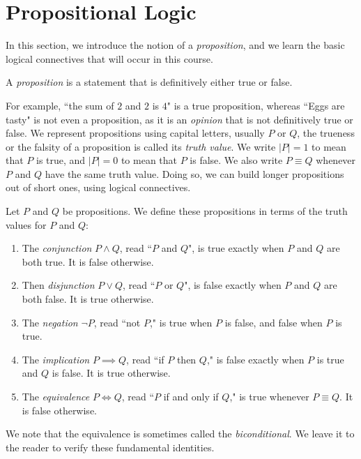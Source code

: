 \documentclass{article}
\begin{document}
\section{Propositional Logic}
In this section, we introduce the notion of a \textit{proposition}, and we learn the basic logical connectives that will occur in this course.
\begin{definition}
A \textit{proposition} is a statement that is definitively either true or false.
\end{definition}
For example, ``the sum of $2$ and $2$ is $4$" is a true proposition, whereas ``Eggs are tasty" is not even a proposition, as it is an \textit{opinion} that is not definitively true or false. We represent propositions using capital letters, usually $P$ or $Q$, the trueness or the falsity of a proposition is called its \textit{truth value}. We write $|P| = 1$ to mean that $P$ is true, and $|P| = 0$ to mean that $P$ is false. We also write $P\equiv Q$ whenever $P$ and $Q$ have the same truth value. Doing so, we can build longer propositions out of short ones, using logical connectives.
\begin{definition}
Let $P$ and $Q$ be propositions. We define these propositions in terms of the truth values for $P$ and $Q$:
\begin{enumerate}
    \item The \textit{conjunction} $P\land Q$, read ``$P$ and $Q$", is true exactly when $P$ and $Q$ are both true. It is false otherwise.
    \item Then \textit{disjunction} $P\lor Q$, read ``$P$ or $Q$", is false exactly when $P$ and $Q$ are both false. It is true otherwise.
    \item The \textit{negation} $\lnot P$, read ``not $P$," is true when $P$ is false, and false when $P$ is true.
    \item The \textit{implication} $P\implies Q$, read ``if $P$ then $Q$," is false exactly when $P$ is true and $Q$ is false. It is true otherwise.
    \item The \textit{equivalence} $P\iff Q$, read ``$P$ if and only if $Q$," is true whenever $P\equiv Q$. It is false otherwise.
\end{enumerate}
\end{definition}
We note that the equivalence is sometimes called the \textit{biconditional}. We leave it to the reader to verify these fundamental identities.
\end{document}
